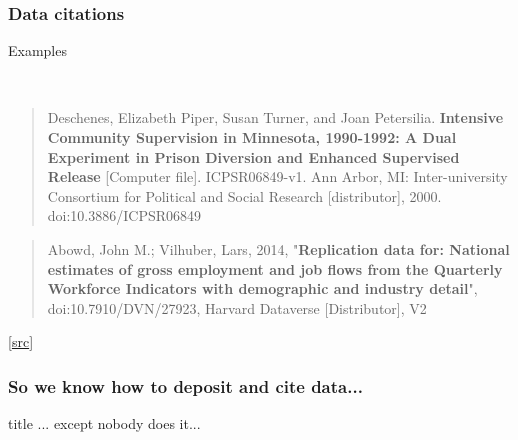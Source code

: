 \begin{frame}
	\frametitle{Data citations}
	\begin{block}{Examples} {\tiny  \footnotesize \tt
		\begin{quote}
			Deschenes, Elizabeth Piper, Susan Turner, and Joan Petersilia. \textbf{Intensive Community Supervision in Minnesota, 1990-1992: A Dual Experiment in Prison Diversion and Enhanced Supervised Release} [Computer file]. ICPSR06849-v1. Ann Arbor, MI: Inter-university Consortium for Political and Social Research [distributor], 2000. \alert<2>{doi:10.3886/ICPSR06849}
		\end{quote}
		\begin{quote}
			Abowd, John M.; Vilhuber, Lars, 2014, "\textbf{Replication data for: National estimates of gross employment and job flows from the Quarterly Workforce Indicators with demographic and industry detail}", \alert<2>{doi:10.7910/DVN/27923}, Harvard Dataverse [Distributor], V2
		\end{quote}[\href{http://www.icpsr.umich.edu/icpsrweb/ICPSR/curation/citations.jsp}{src}]}
	\end{block}
\end{frame}

\begin{frame}
	\frametitle{So we know how to deposit and cite data...}
	\pause
\begin{beamercolorbox}[sep=8pt,center]{title}
	... except nobody does it...
\end{beamercolorbox}

\end{frame}


